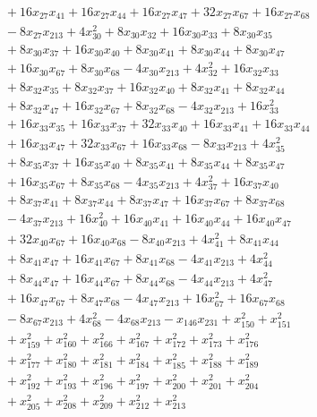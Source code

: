 \begin{align*}
&\quad +16 x_{27} x_{41} +16 x_{27} x_{44} +16 x_{27} x_{47} +32 x_{27} x_{67} +16 x_{27} x_{68} \\
&\quad -8 x_{27} x_{213} +4 x_{30}^{2} +8 x_{30} x_{32} +16 x_{30} x_{33} +8 x_{30} x_{35} \\
&\quad +8 x_{30} x_{37} +16 x_{30} x_{40} +8 x_{30} x_{41} +8 x_{30} x_{44} +8 x_{30} x_{47} \\
&\quad +16 x_{30} x_{67} +8 x_{30} x_{68} -4 x_{30} x_{213} +4 x_{32}^{2} +16 x_{32} x_{33} \\
&\quad +8 x_{32} x_{35} +8 x_{32} x_{37} +16 x_{32} x_{40} +8 x_{32} x_{41} +8 x_{32} x_{44} \\
&\quad +8 x_{32} x_{47} +16 x_{32} x_{67} +8 x_{32} x_{68} -4 x_{32} x_{213} +16 x_{33}^{2} \\
&\quad +16 x_{33} x_{35} +16 x_{33} x_{37} +32 x_{33} x_{40} +16 x_{33} x_{41} +16 x_{33} x_{44} \\
&\quad +16 x_{33} x_{47} +32 x_{33} x_{67} +16 x_{33} x_{68} -8 x_{33} x_{213} +4 x_{35}^{2} \\
&\quad +8 x_{35} x_{37} +16 x_{35} x_{40} +8 x_{35} x_{41} +8 x_{35} x_{44} +8 x_{35} x_{47} \\
&\quad +16 x_{35} x_{67} +8 x_{35} x_{68} -4 x_{35} x_{213} +4 x_{37}^{2} +16 x_{37} x_{40} \\
&\quad +8 x_{37} x_{41} +8 x_{37} x_{44} +8 x_{37} x_{47} +16 x_{37} x_{67} +8 x_{37} x_{68} \\
&\quad -4 x_{37} x_{213} +16 x_{40}^{2} +16 x_{40} x_{41} +16 x_{40} x_{44} +16 x_{40} x_{47} \\
&\quad +32 x_{40} x_{67} +16 x_{40} x_{68} -8 x_{40} x_{213} +4 x_{41}^{2} +8 x_{41} x_{44} \\
&\quad +8 x_{41} x_{47} +16 x_{41} x_{67} +8 x_{41} x_{68} -4 x_{41} x_{213} +4 x_{44}^{2} \\
&\quad +8 x_{44} x_{47} +16 x_{44} x_{67} +8 x_{44} x_{68} -4 x_{44} x_{213} +4 x_{47}^{2} \\
&\quad +16 x_{47} x_{67} +8 x_{47} x_{68} -4 x_{47} x_{213} +16 x_{67}^{2} +16 x_{67} x_{68} \\
&\quad -8 x_{67} x_{213} +4 x_{68}^{2} -4 x_{68} x_{213} -x_{146} x_{231} +x_{150}^{2} +x_{151}^{2} \\
&\quad +x_{159}^{2} +x_{160}^{2} +x_{166}^{2} +x_{167}^{2} +x_{172}^{2} +x_{173}^{2} +x_{176}^{2} \\
&\quad +x_{177}^{2} +x_{180}^{2} +x_{181}^{2} +x_{184}^{2} +x_{185}^{2} +x_{188}^{2} +x_{189}^{2} \\
&\quad +x_{192}^{2} +x_{193}^{2} +x_{196}^{2} +x_{197}^{2} +x_{200}^{2} +x_{201}^{2} +x_{204}^{2} \\
&\quad +x_{205}^{2} +x_{208}^{2} +x_{209}^{2} +x_{212}^{2} +x_{213}^{2}
\end{align*}

